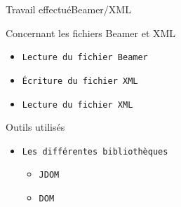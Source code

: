 \documentclass[10pt]{beamer}
\begin{document}
\begin{frame}{Travail effectué}{Beamer/XML}
	\begin{block}{Concernant les fichiers Beamer et XML}
	  	\begin{itemize}
	  		\item {\tt Lecture du fichier Beamer}
	  		\item {\tt Écriture du fichier XML}
	  		\item {\tt Lecture du fichier XML}
		\end{itemize}
	\end{block}
	
	\begin{block}{Outils utilisés}
		\begin{itemize}
			\item {\tt Les différentes bibliothèques}
			\begin{itemize}
				\item {\tt JDOM}
				\item {\tt DOM}
			\end{itemize}
		\end{itemize}
	\end{block}
		  			
\end{frame}
\end{document}
